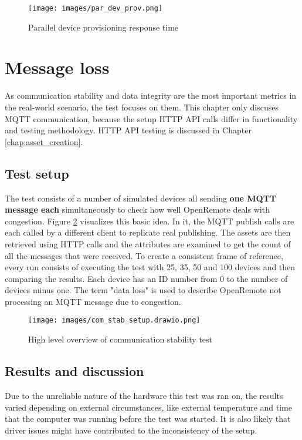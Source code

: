 \begin{figure}[ht]
    \centering
    \texttt{[image: images/par\_dev\_prov.png]}
    \caption{Parallel device provisioning response time}
    \label{fig:par_dev_prov}
\end{figure}


\section{Message loss}\label{chap:com_stab}
As communication stability and data integrity are the most important metrics in the real-world scenario, the test focuses on them. This chapter only discuses MQTT communication, because the setup HTTP API calls differ in functionality and testing methodology. HTTP API testing is discussed in Chapter \ref{chap:asset_creation}.

\subsection{Test setup}
The test consists of a number of simulated devices all sending \textbf{one MQTT message each} simultaneously to check how well OpenRemote deals with congestion. Figure \ref{fig:com_stab_setup} visualizes this basic idea. In it, the MQTT publish calls are each called by a different client to replicate real publishing. The assets are then retrieved using HTTP calls and the attributes are examined to get the count of all the messages that were received. To create a consistent frame of reference, every run consists of executing the test with 25, 35, 50 and 100 devices and then comparing the results. Each device has an ID number from 0 to the number of devices minus one. The term "data loss" is used to describe OpenRemote not processing an MQTT message due to congestion.

\begin{figure}[ht]
    \centering
    \texttt{[image: images/com\_stab\_setup.drawio.png]}
    \caption{High level overview of communication stability test}
    \label{fig:com_stab_setup}
\end{figure}


\subsection{Results and discussion}
Due to the unreliable nature of the hardware this test was ran on, the results varied depending on external circumstances, like external temperature and time that the computer was running before the test was started. It is also likely that driver issues might have contributed to the inconsistency of the setup.

